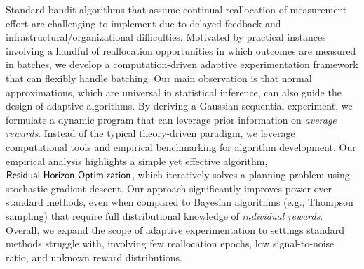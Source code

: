 

Standard bandit algorithms that assume continual reallocation of measurement
effort are challenging to implement due to delayed feedback and
infrastructural/organizational difficulties. Motivated by practical instances
involving a handful of reallocation opportunities in which outcomes are
measured in batches, we develop a computation-driven adaptive experimentation
framework that can flexibly handle batching.  Our main observation is that
normal approximations, which are universal in statistical inference, can also
guide the design of adaptive algorithms. By deriving a Gaussian sequential
experiment, we formulate a dynamic program that can leverage prior information
on \emph{average rewards}.  Instead of the typical theory-driven paradigm, we
leverage computational tools and empirical benchmarking for algorithm
development. Our empirical analysis highlights a simple yet effective
algorithm, $\mathsf{Residual~Horizon~Optimization}$, which iteratively solves a planning problem using
stochastic gradient descent.  Our approach significantly improves power over
standard methods, even when compared to Bayesian algorithms (e.g., Thompson
sampling) that require full distributional knowledge of \emph{individual
rewards}.  Overall, we expand the scope of adaptive experimentation to
settings standard methods struggle with, involving few reallocation epochs,
low signal-to-noise ratio, and unknown reward distributions.


